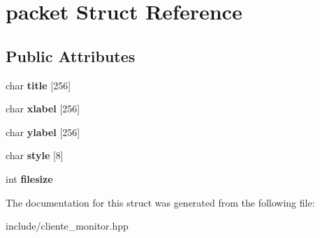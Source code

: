 \hypertarget{structpacket}{}\section{packet Struct Reference}
\label{structpacket}
\subsection*{Public Attributes}
\begin{DoxyCompactItemize}
\item 
\mbox{\label{structpacket_a8ad06a681540e64e282fcfe91135b5ed}} 
char {\bfseries title} \mbox{[}256\mbox{]}
\item 
\mbox{\label{structpacket_a934bd13ff7c66b2e21913bda034dcd8a}} 
char {\bfseries xlabel} \mbox{[}256\mbox{]}
\item 
\mbox{\label{structpacket_a563b4b71273090b8e3e62f45b4f7cb4e}} 
char {\bfseries ylabel} \mbox{[}256\mbox{]}
\item 
\mbox{\label{structpacket_a1907bedef52c6391e8dba555c2923782}} 
char {\bfseries style} \mbox{[}8\mbox{]}
\item 
\mbox{\label{structpacket_a267928714bc5523a5b0e1edb2ef88d71}} 
int {\bfseries filesize}
\end{DoxyCompactItemize}


The documentation for this struct was generated from the following file\+:\begin{DoxyCompactItemize}
\item 
include/cliente\+\_\+monitor.\+hpp\end{DoxyCompactItemize}
